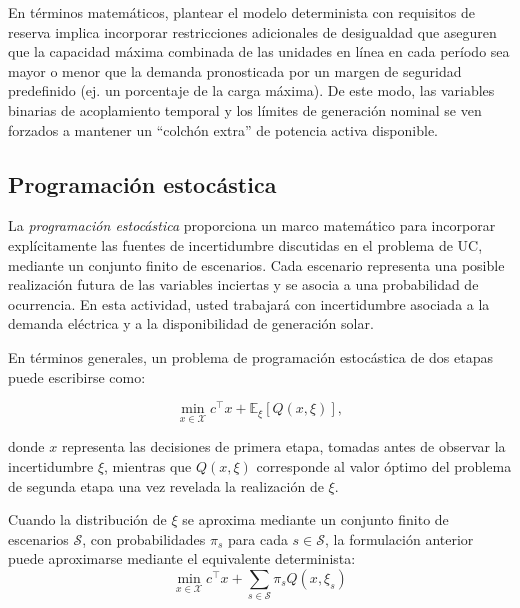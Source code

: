 \documentclass[
	spanish, %
	letterpaper, oneside
]{article}
\begin{document}
En términos matemáticos, plantear el modelo determinista con requisitos de reserva implica incorporar restricciones adicionales de desigualdad que aseguren que la capacidad máxima combinada de las unidades en línea en cada período sea mayor o menor que la demanda pronosticada por un margen de seguridad predefinido (ej. un porcentaje de la carga máxima). De este modo, las variables binarias de acoplamiento temporal y los límites de generación nominal se ven forzados a mantener un ``colchón extra'' de potencia activa disponible.

\subsection{Programación estocástica}


La \textit{programación estocástica} proporciona un marco matemático para incorporar explícitamente las fuentes de incertidumbre discutidas en el problema de UC,  mediante un conjunto finito de escenarios. Cada escenario representa una posible realización futura de las variables inciertas y se asocia a una probabilidad de ocurrencia. En esta actividad, usted trabajará con incertidumbre asociada a la demanda eléctrica y a la disponibilidad de generación solar.

En términos generales, un problema de programación estocástica de dos etapas puede escribirse como:

\begin{equation}
\min_{x \in \mathcal{X}}
c^\top x + \mathbb{E}_{\xi} \left[ Q(x,\xi) \right],
\label{eq:fo}
\end{equation}

donde $x$ representa las decisiones de primera etapa, tomadas antes de observar la incertidumbre $\xi$, mientras que $Q(x,\xi)$ corresponde al valor óptimo del problema de segunda etapa una vez revelada la realización de $\xi$.

Cuando la distribución de $\xi$ se aproxima mediante un conjunto finito de escenarios $\mathcal{S}$, con probabilidades $\pi_s$ para cada $s \in \mathcal{S}$, la formulación anterior puede aproximarse mediante el equivalente determinista:
\begin{equation}
\min_{x \in \mathcal{X}}
c^\top x + \sum_{s \in \mathcal{S}} \pi_s Q(x,\xi_s)
\label{eq}
\end{equation}
\end{document}
